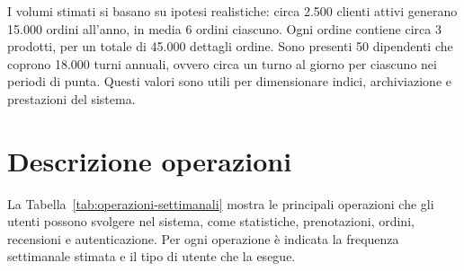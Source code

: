 \documentclass[a4paper,12pt]{report}
\begin{document}
I volumi stimati si basano su ipotesi realistiche: circa 2.500
clienti attivi generano 15.000 ordini all'anno, in media 6 ordini
ciascuno. Ogni ordine contiene circa 3 prodotti, per un totale di
45.000 dettagli ordine. Sono presenti 50 dipendenti che coprono
18.000 turni annuali, ovvero circa un turno al giorno per ciascuno
nei periodi di punta. Questi valori sono utili per dimensionare
indici, archiviazione e prestazioni del sistema.

\section{Descrizione operazioni}
La Tabella~\ref{tab:operazioni-settimanali} mostra le principali
operazioni che gli utenti possono svolgere nel sistema, come
statistiche, prenotazioni, ordini, recensioni e autenticazione. Per
ogni operazione è indicata la frequenza settimanale stimata e
il tipo di utente che la esegue.
\end{document}
